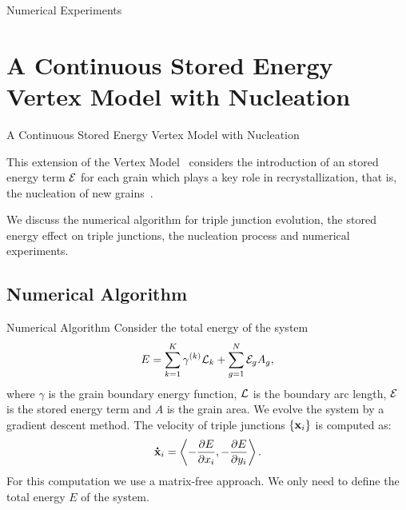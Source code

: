 \documentclass[usenames,dvipsnames]{beamer}
\begin{document}
\begin{frame}{Numerical Experiments}
\begin{minipage}{0.5\textwidth}
\begin{figure}
\end{figure}
\end{minipage}
\end{frame}



\section[Stored Energy Model with Nucleation]{A Continuous Stored Energy Vertex
Model with Nucleation}

\begin{frame}{A Continuous Stored Energy Vertex
Model with Nucleation}

This extension of the Vertex Model~\cite{torres2015} considers the introduction of an stored energy term $\mathcal{E}$ for each grain which plays a key role in recrystallization, that is, the nucleation of new grains~\cite{pikekos2008generalized, pikekos2008stochastic}.

We discuss the numerical algorithm for triple junction evolution, the stored energy effect on triple junctions, the nucleation process and numerical experiments.
\end{frame}


\subsection{Numerical Algorithm}
\begin{frame}{Numerical Algorithm}
Consider the total energy of the system
\begin{equation*}
    E = \sum_{k=1}^K \gamma^{(k)}\mathcal{L}_k + \sum_{g = 1}^N \mathcal{E}_g A_g,
\end{equation*}
where $\gamma$ is the grain boundary energy function, $\mathcal{L}$ is the boundary arc length, $\mathcal{E}$ is the stored energy term and $A$ is the grain area. We evolve the system by a gradient descent method. The velocity of triple junctions $\{\x_i\}$ is computed as:
\begin{equation*}
    \dotx_i = \left\langle -\frac{\partial E}{\partial x_i}, -\frac{\partial E}{\partial y_i} \right\rangle.
\end{equation*}
For this computation we use a {\color{red}matrix-free} approach. We only need to define the total energy $E$ of the system.
\end{frame}
\end{document}
